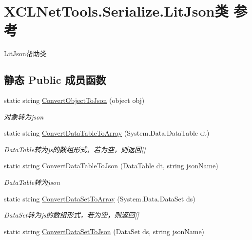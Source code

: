 \hypertarget{class_x_c_l_net_tools_1_1_serialize_1_1_lit_json}{\section{X\-C\-L\-Net\-Tools.\-Serialize.\-Lit\-Json类 参考}
\label{class_x_c_l_net_tools_1_1_serialize_1_1_lit_json}
}


Lit\-Json帮助类  


\subsection*{静态 Public 成员函数}
\begin{DoxyCompactItemize}
\item 
static string \hyperlink{class_x_c_l_net_tools_1_1_serialize_1_1_lit_json_a81a2b398d509a227753a98e12a79674e}{Convert\-Object\-To\-Json} (object obj)
\begin{DoxyCompactList}\small\item\em 对象转为json \end{DoxyCompactList}\item 
static string \hyperlink{class_x_c_l_net_tools_1_1_serialize_1_1_lit_json_a8bd51fdf8d1e56bee3e72c165f4d34ae}{Convert\-Data\-Table\-To\-Array} (System.\-Data.\-Data\-Table dt)
\begin{DoxyCompactList}\small\item\em Data\-Table转为js的数组形式，若为空，则返回\mbox{[}\mbox{]} \end{DoxyCompactList}\item 
static string \hyperlink{class_x_c_l_net_tools_1_1_serialize_1_1_lit_json_a118c20cd6f5a519aa5061f1d95f13c94}{Convert\-Data\-Table\-To\-Json} (Data\-Table dt, string json\-Name)
\begin{DoxyCompactList}\small\item\em Data\-Table转为json \end{DoxyCompactList}\item 
static string \hyperlink{class_x_c_l_net_tools_1_1_serialize_1_1_lit_json_a62018ecad0868724f8c525f6633c2db1}{Convert\-Data\-Set\-To\-Array} (System.\-Data.\-Data\-Set ds)
\begin{DoxyCompactList}\small\item\em Data\-Set转为js的数组形式，若为空，则返回\mbox{[}\mbox{]} \end{DoxyCompactList}\item 
static string \hyperlink{class_x_c_l_net_tools_1_1_serialize_1_1_lit_json_afe0e32c9376fb1c7f2c222eb8cfdcc18}{Convert\-Data\-Set\-To\-Json} (Data\-Set ds, string json\-Name)

\end{DoxyCompactItemize}
